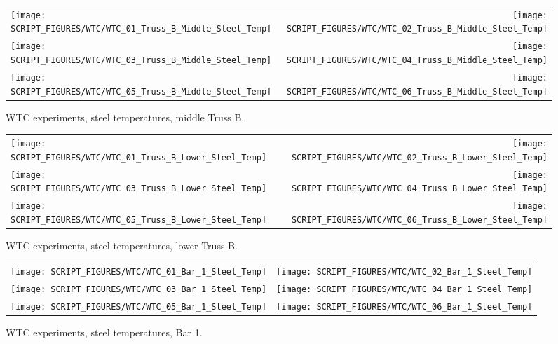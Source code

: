 \begin{figure}[p]
\begin{tabular*}{\textwidth}{l@{\extracolsep{\fill}}r}
\texttt{[image: SCRIPT\_FIGURES/WTC/WTC\_01\_Truss\_B\_Middle\_Steel\_Temp]} &
\texttt{[image: SCRIPT\_FIGURES/WTC/WTC\_02\_Truss\_B\_Middle\_Steel\_Temp]} \\
\texttt{[image: SCRIPT\_FIGURES/WTC/WTC\_03\_Truss\_B\_Middle\_Steel\_Temp]} &
\texttt{[image: SCRIPT\_FIGURES/WTC/WTC\_04\_Truss\_B\_Middle\_Steel\_Temp]} \\
\texttt{[image: SCRIPT\_FIGURES/WTC/WTC\_05\_Truss\_B\_Middle\_Steel\_Temp]} &
\texttt{[image: SCRIPT\_FIGURES/WTC/WTC\_06\_Truss\_B\_Middle\_Steel\_Temp]}
\end{tabular*}
\caption{WTC experiments, steel temperatures, middle Truss B.}
\label{NIST_WTC_Truss_B_Middle_Steel_Temp}
\end{figure}

\begin{figure}[p]
\begin{tabular*}{\textwidth}{l@{\extracolsep{\fill}}r}
\texttt{[image: SCRIPT\_FIGURES/WTC/WTC\_01\_Truss\_B\_Lower\_Steel\_Temp]} &
\texttt{[image: SCRIPT\_FIGURES/WTC/WTC\_02\_Truss\_B\_Lower\_Steel\_Temp]} \\
\texttt{[image: SCRIPT\_FIGURES/WTC/WTC\_03\_Truss\_B\_Lower\_Steel\_Temp]} &
\texttt{[image: SCRIPT\_FIGURES/WTC/WTC\_04\_Truss\_B\_Lower\_Steel\_Temp]} \\
\texttt{[image: SCRIPT\_FIGURES/WTC/WTC\_05\_Truss\_B\_Lower\_Steel\_Temp]} &
\texttt{[image: SCRIPT\_FIGURES/WTC/WTC\_06\_Truss\_B\_Lower\_Steel\_Temp]}
\end{tabular*}
\caption{WTC experiments, steel temperatures, lower Truss B.}
\label{NIST_WTC_Truss_B_Lower_Steel_Temp}
\end{figure}


\begin{figure}[p]
\begin{tabular*}{\textwidth}{l@{\extracolsep{\fill}}r}
\texttt{[image: SCRIPT\_FIGURES/WTC/WTC\_01\_Bar\_1\_Steel\_Temp]} &
\texttt{[image: SCRIPT\_FIGURES/WTC/WTC\_02\_Bar\_1\_Steel\_Temp]} \\
\texttt{[image: SCRIPT\_FIGURES/WTC/WTC\_03\_Bar\_1\_Steel\_Temp]} &
\texttt{[image: SCRIPT\_FIGURES/WTC/WTC\_04\_Bar\_1\_Steel\_Temp]} \\
\texttt{[image: SCRIPT\_FIGURES/WTC/WTC\_05\_Bar\_1\_Steel\_Temp]} &
\texttt{[image: SCRIPT\_FIGURES/WTC/WTC\_06\_Bar\_1\_Steel\_Temp]}
\end{tabular*}
\caption{WTC experiments, steel temperatures, Bar 1.}
\label{NIST_WTC_Bar_1_Steel_Temp}
\end{figure}


